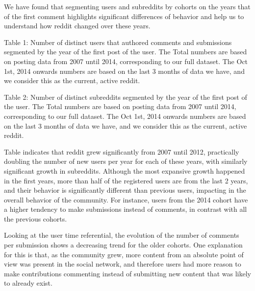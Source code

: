 We have found that segmenting users and subreddits by cohorts on the years that of the first comment highlights significant differences of behavior and help us to understand how reddit changed over these years.


Table 1: Number of distinct users that authored comments and submissions segmented by the year of the first post of the user. The Total numbers are based on posting data from 2007 until 2014, corresponding to our full dataset. The Oct 1st, 2014 onwards numbers are based on the last 3 months of data we have, and we consider this as the current, active reddit.


Table 2: Number of distinct subreddits segmented by the year of the first post of the user. The Total numbers are based on posting data from 2007 until 2014, corresponding to our full dataset. The Oct 1st, 2014 onwards numbers are based on the last 3 months of data we have, and we consider this as the current, active reddit.

Table indicates that reddit grew significantly from 2007 until 2012, practically doubling the number of new users per year for each of these years, with similarly significant growth in subreddits. Although the most expansive growth happened in the first years, more than half of the registered users are from the last 2 years, and their behavior is significantly different than previous users, impacting in the overall behavior of the community. For instance, users from the 2014 cohort have a higher tendency to make submissions instead of comments, in contrast with all the previous cohorts.

Looking at the user time referential, the evolution of the number of comments per submission shows a decreasing trend for the older cohorts. One explanation for this is that, as the community grew, more content from an absolute point of view was present in the social network, and therefore users had more reason to make contributions commenting instead of submitting new content that was likely to already exist.

